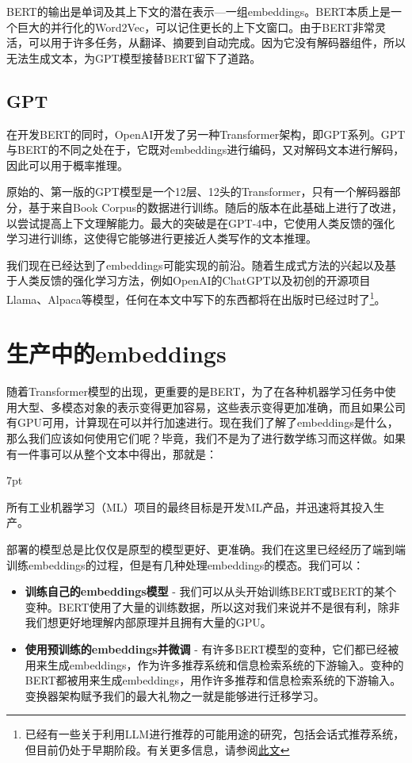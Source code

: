 \documentclass[Chinese, 11pt, table]{diazessay} %
\newenvironment{formal}{%
  \def\FrameCommand{%
	\hspace{1pt}%
	{\color{w_lightblue}\vrule width 2pt}%
	{\color{formalshade}\vrule width 4pt}%
	\colorbox{formalshade}%
  }%
  \MakeFramed{\advance\hsize-\width\FrameRestore}%
  \noindent\hspace{-4.55pt}%
  \begin{adjustwidth}{}{7pt}%
  \vspace{2pt}\vspace{2pt}%
}
{%
  \vspace{2pt}\end{adjustwidth}\endMakeFramed%
}
\begin{document}
\begin{CJK}{UTF8}{gbsn}
\begin{sloppypar}
BERT的输出是单词及其上下文的潜在表示---一组embeddings。BERT本质上是一个巨大的并行化的Word2Vec，可以记住更长的上下文窗口。由于BERT非常灵活，可以用于许多任务，从翻译、摘要到自动完成。因为它没有解码器组件，所以无法生成文本，为GPT模型接替BERT留下了道路。

\subsection{GPT}
在开发BERT的同时，OpenAI开发了另一种Transformer架构，即GPT系列。GPT与BERT的不同之处在于，它既对embeddings进行编码，又对解码文本进行解码，因此可以用于概率推理。

原始的、第一版的GPT模型是一个12层、12头的Transformer，只有一个解码器部分，基于来自Book Corpus的数据进行训练。随后的版本在此基础上进行了改进，以尝试提高上下文理解能力。最大的突破是在GPT-4中，它使用人类反馈的强化学习进行训练，这使得它能够进行更接近人类写作的文本推理。

我们现在已经达到了embeddings可能实现的前沿。随着生成式方法的兴起以及基于人类反馈的强化学习方法，例如OpenAI的ChatGPT以及初创的开源项目Llama、Alpaca等模型，任何在本文中写下的东西都将在出版时已经过时了\footnote{已经有一些关于利用LLM进行推荐的可能用途的研究，包括会话式推荐系统，但目前仍处于早期阶段。有关更多信息，请参阅\href{https://blog.reachsumit.com/posts/2023/05/tuning-llm-for-recsys/}{此文}}。

\section{生产中的embeddings}

随着Transformer模型的出现，更重要的是BERT，为了在各种机器学习任务中使用大型、多模态对象的表示变得更加容易，这些表示变得更加准确，而且如果公司有GPU可用，计算现在可以并行加速进行。现在我们了解了embeddings是什么，那么我们应该如何使用它们呢？毕竟，我们不是为了进行数学练习而这样做。如果有一件事可以从整个文本中得出，那就是：

\begin{formal}
所有工业机器学习（ML）项目的最终目标是开发ML产品，并迅速将其投入生产。\citep{kreuzberger2022machine}
\end{formal}

部署的模型总是比仅仅是原型的模型更好、更准确。我们在这里已经经历了端到端训练embeddings的过程，但是有几种处理embeddings的模态。我们可以：

\begin{itemize}
\item \textbf{训练自己的embeddings模型} - 我们可以从头开始训练BERT或BERT的某个变种。BERT使用了大量的训练数据，所以这对我们来说并不是很有利，除非我们想更好地理解内部原理并且拥有大量的GPU。
\item \textbf{使用预训练的embeddings并微调} - 有许多BERT模型的变种，它们都已经被用来生成embeddings，作为许多推荐系统和信息检索系统的下游输入。变种的BERT都被用来生成embeddings，用作许多推荐和信息检索系统的下游输入。变换器架构赋予我们的最大礼物之一就是能够进行迁移学习。


\end{itemize}
\end{sloppypar}
\end{CJK}
\end{document}
